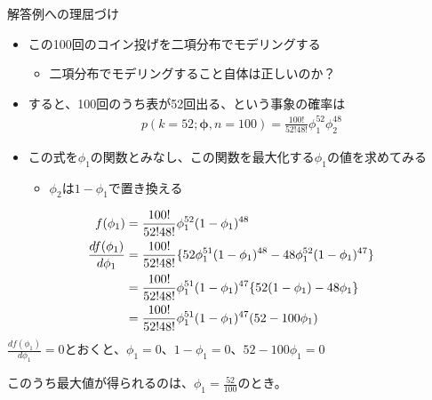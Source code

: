 \documentclass[aspectratio=169,unicode,dvipdfmx,14pt]{beamer}
\begin{document}
\begin{frame}{解答例への理屈づけ}
\begin{itemize}
\item この100回のコイン投げを二項分布でモデリングする
\begin{itemize}
\item 二項分布でモデリングすること自体は正しいのか？
\end{itemize}
\item すると、100回のうち表が52回出る、という事象の確率は
\begin{align}
p(k=52;\bm{\phi},n=100)=\frac{100!}{52!48!}\phi_1^{52}\phi_2^{48}
\end{align}
\item この式を$\phi_1$の関数とみなし、この関数を最大化する$\phi_1$の値を求めてみる
\begin{itemize}
\item $\phi_2$は$1 - \phi_1$で置き換える
\end{itemize}
\end{itemize}
\end{frame}

\begin{frame}
\begin{align}
f(\phi_1) & = \frac{100!}{52!48!}\phi_1^{52}(1-\phi_1)^{48}
\\
\frac{d f(\phi_1)}{d \phi_1} & = 
\frac{100!}{52!48!} 
\{ 52 \phi_1^{51} (1 - \phi_1)^{48} - 48 \phi_1^{52} (1 - \phi_1)^{47} \}
\notag \\ & =
\frac{100!}{52!48!} \phi_1^{51} (1 - \phi_1)^{47} \{ 52 (1 - \phi_1) - 48 \phi_1 \}
\notag \\ & =
\frac{100!}{52!48!} \phi_1^{51} (1 - \phi_1)^{47} ( 52 - 100 \phi_1 )
\label{eq:ML_derivative}
\end{align}
$\frac{d f(\phi_1)}{d \phi_1} = 0$とおくと、$\phi_1=0$、$1-\phi_1=0$、$52 - 100 \phi_1 = 0$

このうち最大値が得られるのは、$\phi_1 = \frac{52}{100}$のとき。
\end{frame}
\end{document}
